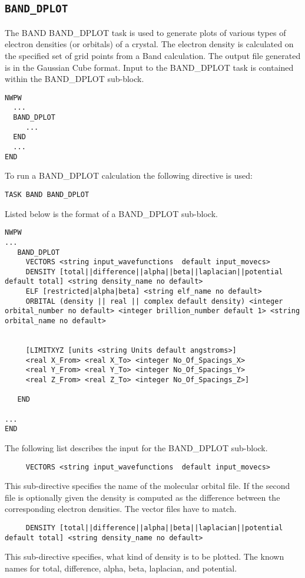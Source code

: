 \normalsize
\subsection{\tt BAND\_DPLOT}
\label{sec:pspw_dplot}
The BAND BAND\_DPLOT task is used to generate plots of various types of electron
densities (or orbitals) of a crystal.  The electron density is calculated on the
specified set of grid points from a Band calculation.  The output file
generated is in the Gaussian Cube format.
Input to the BAND\_DPLOT task is contained
within the BAND\_DPLOT sub-block.
\begin{verbatim}
NWPW
  ...
  BAND_DPLOT
     ...
  END
  ...
END
\end{verbatim}
To run a BAND\_DPLOT calculation the following directive
is used:
\begin{verbatim}
TASK BAND BAND_DPLOT
\end{verbatim}
Listed below is the format of a BAND\_DPLOT sub-block.
\begin{verbatim}
NWPW
...
   BAND_DPLOT
     VECTORS <string input_wavefunctions  default input_movecs>
     DENSITY [total||difference||alpha||beta||laplacian||potential default total] <string density_name no default>
     ELF [restricted|alpha|beta] <string elf_name no default>
     ORBITAL (density || real || complex default density) <integer orbital_number no default> <integer brillion_number default 1> <string orbital_name no default>


     [LIMITXYZ [units <string Units default angstroms>]
     <real X_From> <real X_To> <integer No_Of_Spacings_X>
     <real Y_From> <real Y_To> <integer No_Of_Spacings_Y>
     <real Z_From> <real Z_To> <integer No_Of_Spacings_Z>]

   END

...
END
\end{verbatim}

The following list describes the input for the BAND\_DPLOT
sub-block.

\begin{verbatim}
     VECTORS <string input_wavefunctions  default input_movecs>
\end{verbatim}
 This sub-directive specifies the name of the molecular orbital file. If the second file is optionally given the density is computed as the difference between the corresponding electron densities. The vector files have to match.

\begin{verbatim}
     DENSITY [total||difference||alpha||beta||laplacian||potential default total] <string density_name no default>
\end{verbatim}
This sub-directive specifies, what kind of density is to be plotted. The known names for total, difference, alpha, beta, laplacian, and potential.

